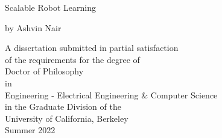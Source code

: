 
\begin{titlepage}
    \begin{center}
        \large  

        \hfill

        \vfill

        \begingroup
            \normalsize{Scalable Robot Learning} %
        \endgroup
        
	

        \vfill

        \medskip

        \normalsize{by} 
        \vfill  
        \medskip
        \normalsize{Ashvin Nair}

        \vfill                      

    \end{center}  

\thispagestyle{empty}



\vfill

\begin{center}
\begin{spacing}{2.0}
A dissertation submitted in partial satisfaction \\ of the requirements 
 for the degree of  \\ Doctor of Philosophy \\ in \\ Engineering - Electrical Engineering \& Computer Science \\
in the  Graduate Division of the  \\ University of California, Berkeley \\
Summer 2022   
\end{spacing}
\end{center}


\end{titlepage}
